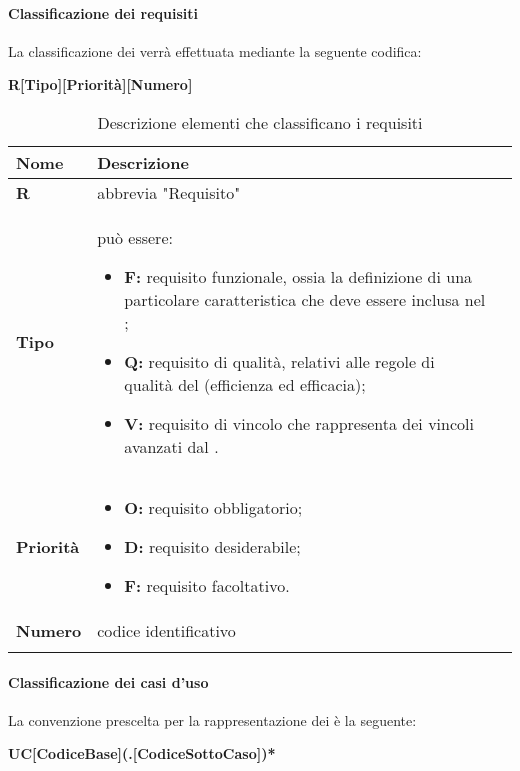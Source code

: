\paragraph*{Classificazione dei requisiti} 
\label{Class_req}
La classificazione dei  verrà effettuata mediante la seguente codifica:\newline \newline
\centerline{\textbf{R[Tipo][Priorità][Numero]}}

\setlength{\freewidth}{\dimexpr\textwidth-0\tabcolsep}
	\renewcommand{\arraystretch}{1.5}
	\setlength{\aboverulesep}{0pt}
	\setlength{\belowrulesep}{0pt}
	\begin{longtable}{L{.15\freewidth} L{.6\freewidth} L{.080\freewidth}}
		\toprule 
		\textbf{Nome} & \textbf{Descrizione} \\
		\toprule
		\endhead		
		\textbf{R} & abbrevia "Requisito" \\
		\textbf{Tipo} & può essere: \begin{itemize}
		\item \textbf{F:} requisito funzionale, ossia la definizione di una particolare caratteristica che deve essere inclusa nel ;
		\item \textbf{Q:} requisito di qualità, relativi alle regole di qualità del  (efficienza ed efficacia);
		\item \textbf{V:} requisito di vincolo che rappresenta dei vincoli avanzati dal .
	\end{itemize}  \\
		\textbf{Priorità} & \begin{itemize}
		\item \textbf{O:} requisito obbligatorio;
		\item \textbf{D:} requisito desiderabile;
		\item \textbf{F:} requisito facoltativo.
	\end{itemize} \\
		\textbf{Numero } & codice identificativo \\
		\bottomrule
		\hiderowcolors
		\caption{Descrizione elementi che classificano i requisiti}
	\end{longtable}


\paragraph*{Classificazione dei casi d'uso} 
\label{Class_uso}
La convenzione prescelta per la rappresentazione dei  è la seguente: \newline \newline
\centerline{\textbf{UC[CodiceBase](.[CodiceSottoCaso])*}}

